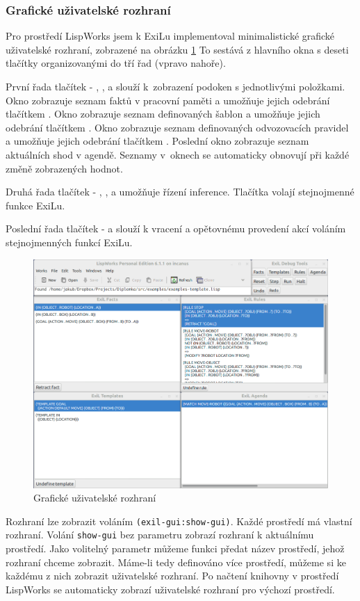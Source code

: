 \subsubsection{Grafické uživatelské rozhraní}
\label{guide gui}

Pro prostředí LispWorks jsem k ExiLu implementoval minimalistické grafické
uživatelské rozhraní, zobrazené na obrázku \ref{gui} To sestává z hlavního okna
s deseti tlačítky organizovanými do tří řad (vpravo nahoře).

První řada tlačítek - , ,  a 
slouží k~zobrazení podoken s jednotlivými položkami. Okno  zobrazuje
seznam faktů v pracovní paměti a umožňuje jejich odebrání tlačítkem
. Okno  zobrazuje seznam definovaných šablon a
umožňuje jejich odebrání tlačítkem . Okno 
zobrazuje seznam definovaných odvozovacích pravidel a umožňuje jejich odebrání
tlačítkem . Poslední okno  zobrazuje seznam
aktuálních shod v agendě. Seznamy v~oknech se automaticky obnovují při každé
změně zobrazených hodnot.

Druhá řada tlačítek - , ,  a  umožňuje
řízení inference. Tlačítka volají stejnojmenné funkce ExiLu.

Poslední řada tlačítek -  a  slouží k vracení a opětovnému
provedení akcí voláním stejnojmenných funkcí ExiLu.

\begin{figure}[h]
\includegraphics[width=\textwidth]{exil-gui.png}
\caption{Grafické uživatelské rozhraní}
\label{gui}
\end{figure}

Rozhraní lze zobrazit voláním \verb|(exil-gui:show-gui)|. Každé prostředí má
vlastní rozhraní. Volání \verb|show-gui| bez parametru zobrazí rozhraní k
aktuálnímu prostředí. Jako volitelný parametr můžeme funkci předat název
prostředí, jehož rozhraní chceme zobrazit. Máme-li tedy definováno více
prostředí, můžeme si ke každému z nich zobrazit uživatelské rozhraní. Po načtení
knihovny v prostředí LispWorks se automaticky zobrazí uživatelské rozhraní pro
výchozí prostředí.
